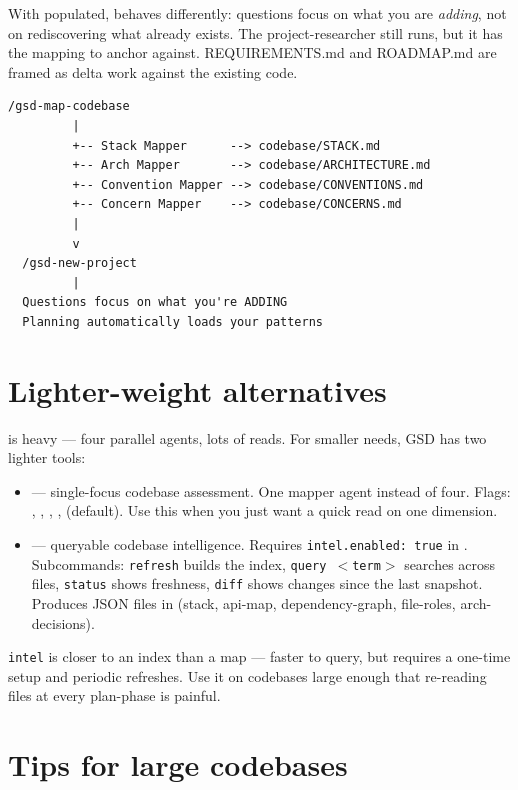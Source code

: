 \documentclass[11pt,letterpaper,openany]{book}
\begin{document}
With  populated,  behaves differently: questions focus on what you are \emph{adding}, not on rediscovering what already exists. The project-researcher still runs, but it has the mapping to anchor against. REQUIREMENTS.md and ROADMAP.md are framed as delta work against the existing code.

\begin{lstlisting}[style=gsddiagram]
  /gsd-map-codebase
         |
         +-- Stack Mapper      --> codebase/STACK.md
         +-- Arch Mapper       --> codebase/ARCHITECTURE.md
         +-- Convention Mapper --> codebase/CONVENTIONS.md
         +-- Concern Mapper    --> codebase/CONCERNS.md
         |
         v
  /gsd-new-project
         |
  Questions focus on what you're ADDING
  Planning automatically loads your patterns
\end{lstlisting}

\section{Lighter-weight alternatives}

 is heavy --- four parallel agents, lots of reads. For smaller needs, GSD has two lighter tools:

\begin{itemize}[itemsep=2pt]
  \item {} --- single-focus codebase assessment. One mapper agent instead of four. Flags: , , , ,  (default). Use this when you just want a quick read on one dimension.
  \item {} --- queryable codebase intelligence. Requires \texttt{intel.enabled: true} in . Subcommands: \texttt{refresh} builds the index, \texttt{query $<$term$>$} searches across files, \texttt{status} shows freshness, \texttt{diff} shows changes since the last snapshot. Produces JSON files in  (stack, api-map, dependency-graph, file-roles, arch-decisions).
\end{itemize}

\texttt{intel} is closer to an index than a map --- faster to query, but requires a one-time setup and periodic refreshes. Use it on codebases large enough that re-reading files at every plan-phase is painful.

\section{Tips for large codebases}
\end{document}
